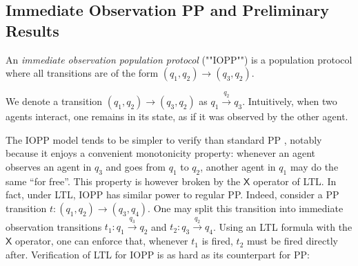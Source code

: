 \documentclass[10pt,a4paper]{article}
\newcommand{\chana}[1]{\todo[color=green!20]{\small #1}}
\newcommand{\trans}[1]{\xrightarrow{#1}}       %
\newcommand{\ltlnext}{\mathsf{X}}
\begin{document}
\subsection{Immediate Observation PP and Preliminary Results}

\begin{definition}
	An \emph{immediate observation population protocol} (""IOPP"") is a population protocol where all transitions are of the form \((q_1, q_2)\trans{} (q_3, q_2)\).
\end{definition}

We denote a transition \((q_1, q_2)\trans{} (q_3, q_2)\) as \(q_1\trans{q_2} q_3\).
Intuitively, when two agents interact, one remains in its state, as if it was observed by the other agent.

\chana{put an example?}

The IOPP model tends to be simpler to verify than standard PP \cite{ERW19}, notably because it enjoys a convenient monotonicity property: whenever an agent observes an agent in \(q_3\) and goes from \(q_1\) to \(q_2\), another agent in \(q_1\) may do the same ``for free''.
This property is however broken by the \(\ltlnext\) operator of LTL.
In fact, under LTL, IOPP has similar power to regular PP.
Indeed, consider a PP transition \(t: (q_1,q_2) \trans{} (q_3,q_4)\).
One may split this transition into immediate observation transitions \(t_1: q_1 \trans{q_3} q_2\) and \(t_2: q_3 \trans{q_2} q_4\).
Using an LTL formula with the \(\ltlnext\) operator, one can enforce that, whenever \(t_1\) is fired, \(t_2\) must be fired directly after.
Verification of LTL for IOPP is as hard as its counterpart for PP:

%
%
%
%
%
%
%
\end{document}

